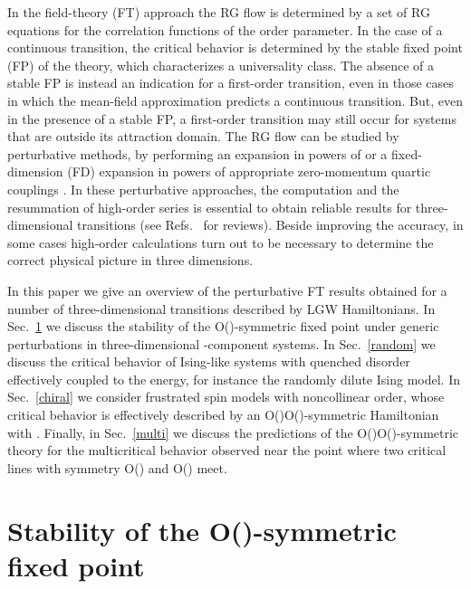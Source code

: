\documentclass[a4paper,12pt]{article}
\begin{document}
In the field-theory (FT) approach the RG flow 
is determined by a set of RG
equations for the correlation functions of the order parameter.
In the case of a continuous transition, 
the critical behavior is determined by the stable fixed point (FP)
of the theory, which characterizes a universality class. 
The absence of a stable FP is instead 
an indication for a first-order transition,
even in those cases in which the mean-field approximation predicts
a continuous transition.
But, even in the presence of a stable FP,
a first-order transition may  still occur
for systems that are outside its attraction domain. 
The RG flow can be studied by perturbative methods, by performing an 
expansion in powers of \coordHE{}\cite{WF-72} or a 
fixed-dimension (FD) expansion in powers of appropriate zero-momentum
quartic couplings \cite{Parisi-80}. 
In these perturbative approaches,
the computation and the resummation of high-order series
is essential to obtain reliable results for three-dimensional transitions
(see Refs.~\cite{Zinn-Justin-book,review} for reviews). 
Beside improving the accuracy, in some cases high-order
calculations turn out to be necessary to determine 
the correct physical picture in three dimensions.

In this paper we give an overview of the perturbative FT
results obtained for a number of three-dimensional transitions 
described by LGW Hamiltonians.
In Sec.~\ref{onstab} we discuss the stability of the 
O(\coordHE{})-symmetric fixed point under generic perturbations in  
three-dimensional \coordHE{}-component systems.
In Sec.~\ref{random} we discuss the critical behavior
of Ising-like systems with quenched disorder
effectively coupled to the energy, for instance the 
randomly dilute Ising model.
In Sec.~\ref{chiral} we consider frustrated spin models
with noncollinear order, whose critical behavior is effectively described
by an O(\coordHE{})\myHighlight{$\otimes$}\coordHE{}O(\coordHE{})-symmetric Hamiltonian with \coordHE{}.
Finally, in Sec.~\ref{multi} we discuss the predictions of 
the O(\coordHE{})\myHighlight{$\oplus$}\coordHE{}O(\coordHE{})-symmetric \coordHE{} theory for 
the multicritical behavior observed near the point
where two critical lines with symmetry O(\coordHE{}) and O(\coordHE{}) meet.


\section{Stability of the O(\coordHE{})-symmetric fixed point}
\label{onstab}
\end{document}
